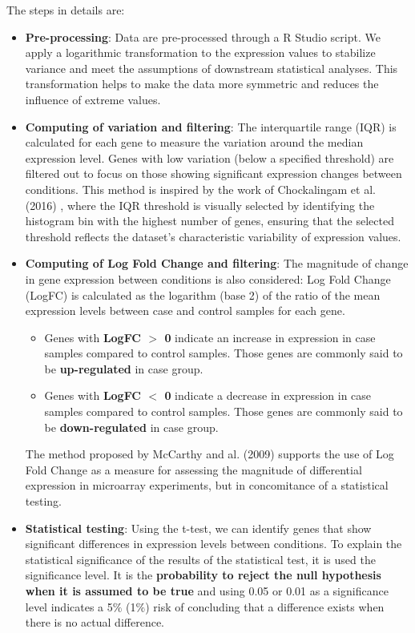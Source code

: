 \documentclass[
	a4paper, %
	10pt, %
	unnumberedsections, %
	twoside, %
]{LTJournalArticle}
\begin{document}
The steps in details are:
\begin{itemize}
    \item \textbf{Pre-processing}: Data are pre-processed through a R Studio script. We apply a logarithmic transformation to the expression values to stabilize variance and meet the assumptions of downstream statistical analyses. This transformation helps to make the data more symmetric and reduces the influence of extreme values.
    \item \textbf{Computing of variation and filtering}: The interquartile range (IQR) is calculated for each gene to measure the variation around the median expression level. Genes with low variation (below a specified threshold) are filtered out to focus on those showing significant expression changes between conditions. This method is inspired by the work of Chockalingam et al. (2016) \cite{chockalingam2016microarray}, where the IQR threshold is visually selected by identifying the histogram bin with the highest number of genes, ensuring that the selected threshold reflects the dataset's characteristic variability of expression values.
\item \textbf{Computing of Log Fold Change and filtering}: The magnitude of change in gene expression between conditions is also considered: Log Fold Change (LogFC) is calculated as the logarithm (base 2) of the ratio of the mean expression levels between case and control samples for each gene. 
    \begin{itemize}
        \item Genes with \textbf{LogFC $>$ 0 }indicate an increase in expression in case samples compared to control samples. Those genes are commonly said to be \textbf{up-regulated} in case group.
        \item Genes with \textbf{LogFC $<$ 0} indicate a decrease in expression in case samples compared to control samples. Those genes are commonly said to be \textbf{down-regulated} in case group.
    \end{itemize}
    The method proposed by McCarthy and al. (2009) \cite{mccarthy2009testing} supports the use of Log Fold Change as a measure for assessing the magnitude of differential expression in microarray experiments, but in concomitance of a statistical testing.
    
\item \textbf{Statistical testing}: Using the t-test, we can identify genes that show significant differences in expression levels between conditions. To explain the statistical significance of the results of the statistical test, it is used the significance level. It is the \textbf{probability to reject the null hypothesis when it is assumed to be true } and using 0.05 or 0.01 as a significance level indicates a 5$\%$ (1$\%$) risk of concluding that a difference exists when there is no actual difference.
    

\end{itemize}
\end{document}
